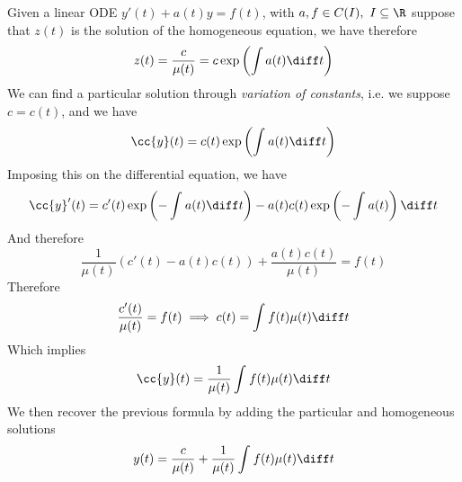 \documentclass[../mmf.tex]{subfiles}
\begin{document}
\begin{mtd}
	Given a linear ODE $y'(t)+a(t)y=f(t)$, with $a,f\in C(I),\ I\subseteq\R$ suppose that $z(t)$ is the solution of the homogeneous equation, we have therefore
	\begin{equation*}
		z(t)=\frac{c}{\mu(t)}=c\exp\left( \int a(t)\diff t \right)
	\end{equation*}
	We can find a particular solution through \textit{variation of constants}, i.e. we suppose $c=c(t)$, and we have
	\begin{equation*}
		\cc{y}(t)=c(t)\exp\left( \int_{}^{}a(t)\diff t \right)
	\end{equation*}
	Imposing this on the differential equation, we have
	\begin{equation*}
		\cc{y}'(t)=c'(t)\exp\left( -\int_{}^{}a(t)\diff t \right)-a(t)c(t)\exp\left( -\int_{}^{}a(t) \right)\diff t
	\end{equation*}
	And therefore
	\begin{equation*}
		\frac{1}{\mu(t)}\left( c'(t)-a(t)c(t) \right)+\frac{a(t)c(t)}{\mu(t)}=f(t)
	\end{equation*}
	Therefore
	\begin{equation*}
		\frac{c'(t)}{\mu(t)}=f(t)\implies{} c(t)=\int_{}^{}f(t)\mu(t)\diff t
	\end{equation*}
	Which implies
	\begin{equation*}
		\cc{y}(t)=\frac{1}{\mu(t)}\int_{}^{}f(t)\mu(t)\diff t
	\end{equation*}
	We then recover the previous formula by adding the particular and homogeneous solutions
	\begin{equation*}
		y(t)=\frac{c}{\mu(t)}+\frac{1}{\mu(t)}\int_{}^{}f(t)\mu(t)\diff t
	\end{equation*}
\end{mtd}
\end{document}
